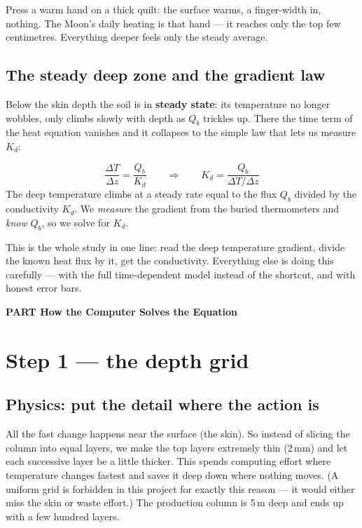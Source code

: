 \documentclass[11pt]{article}
\newcounter{partno}
\newcommand{\partdivider}[1]{%
  \par\addvspace{10pt}\refstepcounter{partno}\FloatBarrier
  \noindent\begin{tcolorbox}[colback=teal!14!white,colframe=teal!50!black,
    boxrule=1pt,arc=2pt,left=10pt,right=10pt,top=5pt,bottom=5pt,
    before skip=4pt,after skip=6pt]
  \centering\large\bfseries\color{teal!40!black}
  PART \Roman{partno}\quad\textbullet\quad #1\end{tcolorbox}\par\addvspace{3pt}}
\renewcommand{\partdivider}[1]{\par\addvspace{10pt}\refstepcounter{partno}%
    \FloatBarrier\noindent\begin{tcolorbox}[colback=gray!15!white,colframe=black,
      boxrule=1pt,arc=2pt,left=10pt,right=10pt,top=5pt,bottom=5pt,
      before skip=4pt,after skip=6pt]\centering\large\bfseries\color{black}
    PART \Roman{partno}\quad\textbullet\quad #1\end{tcolorbox}\par\addvspace{3pt}}
\begin{document}
\begin{plainbox}
Press a warm hand on a thick quilt: the surface warms, a finger-width in,
nothing. The Moon's daily heating is that hand --- it reaches only the
top few centimetres. Everything deeper feels only the steady average.
\end{plainbox}

\subsection{The steady deep zone and the gradient law}
Below the skin depth the soil is in \textbf{steady state}: its
temperature no longer wobbles, only climbs slowly with depth as $Q_b$
trickles up. There the time term of the heat equation vanishes and it
collapses to the simple law that lets us measure $K_d$:
\begin{mathbox}
\[
\frac{\Delta T}{\Delta z} = \frac{Q_b}{K_d}
\qquad\Longrightarrow\qquad
K_d = \frac{Q_b}{\Delta T/\Delta z}
\]
The deep temperature climbs at a steady rate equal to the flux $Q_b$
divided by the conductivity $K_d$. We \emph{measure} the gradient from
the buried thermometers and \emph{know} $Q_b$, so we solve for $K_d$.
\end{mathbox}
\begin{keybox}
This is the whole study in one line: read the deep temperature gradient,
divide the known heat flux by it, get the conductivity. Everything else
is doing this carefully --- with the full time-dependent model instead of
the shortcut, and with honest error bars.
\end{keybox}

\partdivider{How the Computer Solves the Equation}

\section{Step 1 --- the depth grid}
\subsection{Physics: put the detail where the action is}
All the fast change happens near the surface (the skin). So instead of
slicing the column into equal layers, we make the top layers extremely
thin (2\,mm) and let each successive layer be a little thicker. This
spends computing effort where temperature changes fastest and saves it
deep down where nothing moves. (A uniform grid is forbidden in this
project for exactly this reason --- it would either miss the skin or
waste effort.) The production column is 5\,m deep and ends up with a few
hundred layers.
\end{document}
